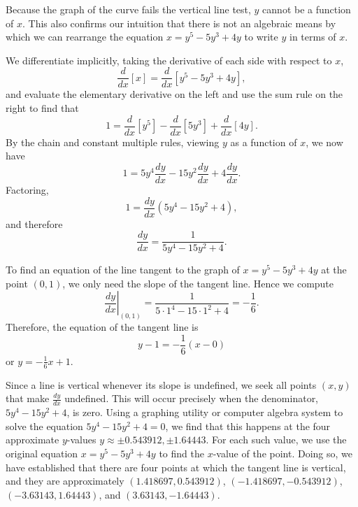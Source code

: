 \begin{activitySolution}
\ba
	\item Because the graph of the curve fails the vertical line test, $y$ cannot be a function of $x$.  This also confirms our intuition that there is not an algebraic means by which we can rearrange the equation $x = y^5 - 5y^3 + 4y$ to write $y$ in terms of $x$.
	\item We differentiate implicitly, taking the derivative of each side with respect to $x$,
	$$\frac{d}{dx}[x ]= \frac{d}{dx}[y^5 - 5y^3 + 4y],$$
	and evaluate the elementary derivative on the left and use the sum rule on the right to find that
	$$1 = \frac{d}{dx}[y^5] - \frac{d}{dx}[5y^3] + \frac{d}{dx}[4y].$$
	By the chain and constant multiple rules, viewing $y$ as a function of $x$, we now have
	$$1 = 5y^4\frac{dy}{dx} - 15y^2\frac{dy}{dx} + 4\frac{dy}{dx}.$$
	Factoring,
	$$1 = \frac{dy}{dx}(5y^4 - 15y^2 + 4),$$
	and therefore
	$$\frac{dy}{dx} = \frac{1}{5y^4 - 15y^2 + 4}.$$
	\item To find an equation of the line tangent to the graph of $x = y^5 - 5y^3 + 4y$ at the point $(0, 1)$, we only need the slope of the tangent line.  Hence we compute 
	$$\left. \frac{dy}{dx} \right|_{(0,1)} = \frac{1}{5 \cdot 1^4 - 15 \cdot 1^2 + 4} = -\frac{1}{6}.$$
	Therefore, the equation of the tangent line is
	$$y - 1 = -\frac{1}{6}(x-0)$$
	or $y = -\frac{1}{6}x + 1$.
	\item Since a line is vertical whenever its slope is undefined, we seek all points $(x,y)$ that make $\frac{dy}{dx}$ undefined.  This will occur precisely when the denominator, $5y^4 - 15y^2 + 4$, is zero.  Using a graphing utility or computer algebra system to solve the equation $5y^4 - 15y^2 + 4 = 0$, we find that this happens at the four approximate $y$-values $y \approx \pm 0.543912, \pm 1.64443$.  For each such value, we use the original equation $x = y^5 - 5y^3 + 4y$ to find the $x$-value of the point.  Doing so, we have established that there are four points at which the tangent line is vertical, and they are approximately $(1.418697,0.543912)$, $(-1.418697,-0.543912)$, $(-3.63143, 1.64443)$, and $(3.63143, -1.64443)$. 
\ea
\end{activitySolution}
\aftera